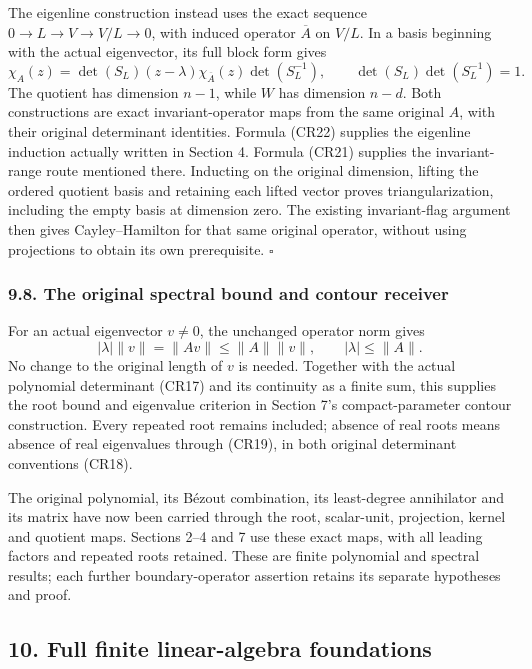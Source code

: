 \documentclass[
  11pt,
]{article}
\begin{document}
The eigenline construction instead uses the exact sequence
\(0\to L\to V\to V/L\to0\), with induced operator \(\overline A\) on
\(V/L\). In a basis beginning with the actual eigenvector, its full
block form gives \[
 \chi_A(z)=\det(S_L)(z-\lambda)
                           \chi_{\overline A}(z)\det(S_L^{-1}),
 \qquad \det(S_L)\det(S_L^{-1})=1.                             \tag{CR22}
\] The quotient has dimension \(n-1\), while \(W\) has dimension
\(n-d\). Both constructions are exact invariant-operator maps from the
same original \(A\), with their original determinant identities. Formula
(CR22) supplies the eigenline induction actually written in Section 4.
Formula (CR21) supplies the invariant-range route mentioned there.
Inducting on the original dimension, lifting the ordered quotient basis
and retaining each lifted vector proves triangularization, including the
empty basis at dimension zero. The existing invariant-flag argument then
gives Cayley--Hamilton for that same original operator, without using
projections to obtain its own prerequisite. \(\square\)

\subsubsection{9.8. The original spectral bound and contour
receiver}\label{the-original-spectral-bound-and-contour-receiver}

For an actual eigenvector \(v\ne0\), the unchanged operator norm gives
\[
 |\lambda|\|v\|=\|Av\|\leq\|A\|\|v\|,
                    \qquad |\lambda|\leq\|A\| .               \tag{CR23}
\] No change to the original length of \(v\) is needed. Together with
the actual polynomial determinant (CR17) and its continuity as a finite
sum, this supplies the root bound and eigenvalue criterion in Section
7's compact-parameter contour construction. Every repeated root remains
included; absence of real roots means absence of real eigenvalues
through (CR19), in both original determinant conventions (CR18).

The original polynomial, its Bézout combination, its least-degree
annihilator and its matrix have now been carried through the root,
scalar-unit, projection, kernel and quotient maps. Sections 2--4 and 7
use these exact maps, with all leading factors and repeated roots
retained. These are finite polynomial and spectral results; each further
boundary-operator assertion retains its separate hypotheses and proof.

\subsection{10. Full finite linear-algebra
foundations}\label{full-finite-linear-algebra-foundations}
\end{document}
